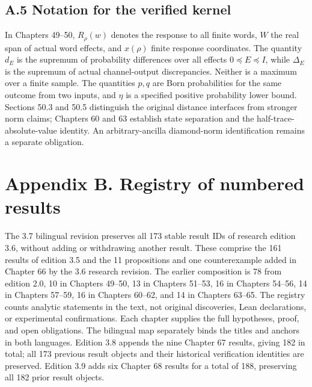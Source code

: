 \documentclass[
  11pt,
  oneside]{book}
\begin{document}
\section{A.5 Notation for the verified kernel}

In Chapters 49--50, \(R_\rho(w)\) denotes the response to all finite
words, \(W\) the real span of actual word effects, and \(x(\rho)\)
finite response coordinates. The quantity \(d_E\) is the supremum of
probability differences over all effects \(0\preceq E\preceq I\), while
\(\Delta_E\) is the supremum of actual channel-output discrepancies.
Neither is a maximum over a finite sample. The quantities \(p,q\) are
Born probabilities for the same outcome from two inputs, and \(\eta\) is
a specified positive probability lower bound. Sections 50.3 and 50.5
distinguish the original distance interfaces from stronger norm claims;
Chapters 60 and 63 establish state separation and the
half-trace-absolute-value identity. An arbitrary-ancilla diamond-norm
identification remains a separate obligation.

\chapter{Appendix B. Registry of numbered results}\label{appendix-b}

The 3.7 bilingual revision preserves all 173 stable result IDs of
research edition 3.6, without adding or withdrawing another result.
These comprise the 161 results of edition 3.5 and the 11 propositions
and one counterexample added in Chapter 66 by the 3.6 research revision.
The earlier composition is 78 from edition 2.0, 10 in Chapters 49--50,
13 in Chapters 51--53, 16 in Chapters 54--56, 14 in Chapters 57--59, 16
in Chapters 60--62, and 14 in Chapters 63--65. The registry counts
analytic statements in the text, not original discoveries, Lean
declarations, or experimental confirmations. Each chapter supplies the
full hypotheses, proof, and open obligations. The bilingual map
separately binds the titles and anchors in both languages. Edition 3.8
appends the nine Chapter 67 results, giving 182 in total; all 173
previous result objects and their historical verification identities are
preserved. Edition 3.9 adds six Chapter 68 results for a total of 188,
preserving all 182 prior result objects.
\end{document}
